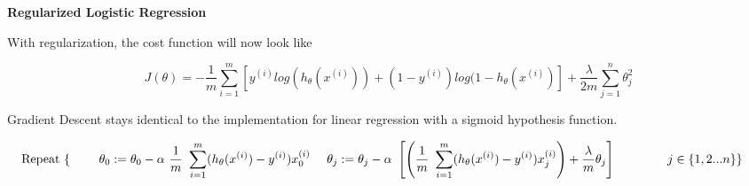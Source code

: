 \documentclass[
]{article}
\begin{document}
\textbf{Regularized Logistic Regression}

With regularization, the cost function will now look like

\[J(\theta) = -\frac{1}{m}\sum^m_{i=1}[y^{(i)}log(h_\theta(x^{(i)}))+(1-y^{(i)})log(1-h_\theta(x^{(i)})] + \frac{\lambda}{2m}\sum^n_{j=1}\theta^2_j\]

Gradient Descent stays identical to the implementation for linear
regression with a sigmoid hypothesis function.

\begin{align*} & \text{Repeat}\ \lbrace \newline & \ \ \ \ \theta_0 := \theta_0 - \alpha\ \frac{1}{m}\ \sum_{i=1}^m (h_\theta(x^{(i)}) - y^{(i)})x_0^{(i)} \newline & \ \ \ \ \theta_j := \theta_j - \alpha\ \left[ \left( \frac{1}{m}\ \sum_{i=1}^m (h_\theta(x^{(i)}) - y^{(i)})x_j^{(i)} \right) + \frac{\lambda}{m}\theta_j \right] &\ \ \ \ \ \ \ \ \ \ j \in \lbrace 1,2...n\rbrace\newline & \rbrace \end{align*}
\end{document}
